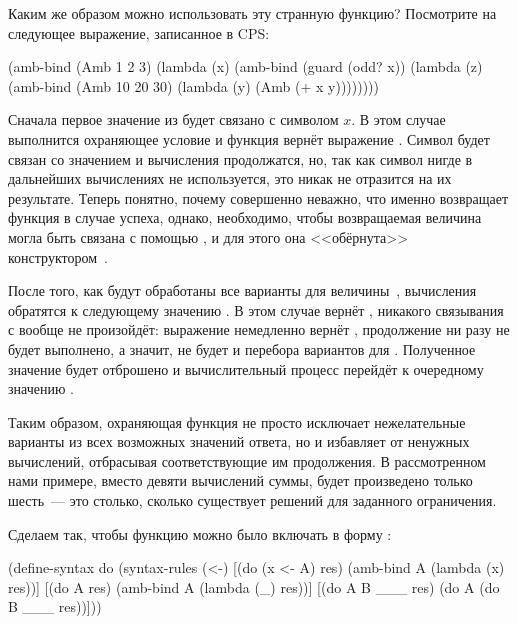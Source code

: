 Каким же образом можно использовать эту странную функцию? Посмотрите на следующее выражение, записанное в CPS:

\begin{SchemeCode}[emph={x,y,z}]
(amb-bind (Amb 1 2 3) 
          (lambda (x) 
            (amb-bind (guard (odd? x))
                      (lambda (z) 
                        (amb-bind (Amb 10 20 30)
                                  (lambda (y) (Amb (+ x y))))))))
\end{SchemeCode}

Сначала первое значение из  будет связано с символом $x$. В этом случае выполнится охраняющее условие и функция  вернёт выражение . Символ  будет связан со значением  и вычисления продолжатся, но, так как символ  нигде в дальнейших вычислениях не используется, это никак не отразится на их результате.  Теперь понятно, почему совершенно неважно, что именно возвращает функция  в случае успеха, однако, необходимо, чтобы возвращаемая величина могла быть связана с помощью , и для этого она <<обёрнута>> конструктором~.

После того, как будут обработаны все варианты для величины~, вычисления обратятся к следующему значению . В этом случае  вернёт , никакого связывания с  вообще не произойдёт: выражение  немедленно вернёт , продолжение  ни разу не будет выполнено, а значит, не будет и перебора вариантов для . Полученное значение  будет отброшено и вычислительный процесс перейдёт к очередному значению .

Таким образом, охраняющая функция  не просто исключает нежелательные варианты из всех возможных значений ответа, но и избавляет от ненужных вычислений, отбрасывая соответствующие им продолжения. В рассмотренном нами примере, вместо девяти вычислений суммы, будет произведено только шесть~--- это столько, сколько существует решений для заданного ограничения.

Сделаем так, чтобы функцию  можно было включать в форму :

\begin{Definition}[emph={x,A,res,B}]
(define-syntax do
  (syntax-rules (<-) 
    [(do (x <- A) res) (amb-bind A (lambda (x) res))]
    [(do A res)        (amb-bind A (lambda (_) res))]
    [(do A B ___ res)  (do A (do B ___ res))]))
\end{Definition}

